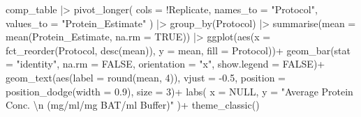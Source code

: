 \documentclass[
  letterpaper,
  DIV=11,
  numbers=noendperiod]{scrreprt}
\newenvironment{Shaded}{\begin{snugshade}}{\end{snugshade}}
\newcommand{\AttributeTok}[1]{\textcolor[rgb]{0.40,0.45,0.13}{#1}}
\newcommand{\ConstantTok}[1]{\textcolor[rgb]{0.56,0.35,0.01}{#1}}
\newcommand{\DecValTok}[1]{\textcolor[rgb]{0.68,0.00,0.00}{#1}}
\newcommand{\FloatTok}[1]{\textcolor[rgb]{0.68,0.00,0.00}{#1}}
\newcommand{\FunctionTok}[1]{\textcolor[rgb]{0.28,0.35,0.67}{#1}}
\newcommand{\NormalTok}[1]{\textcolor[rgb]{0.00,0.23,0.31}{#1}}
\newcommand{\SpecialCharTok}[1]{\textcolor[rgb]{0.37,0.37,0.37}{#1}}
\newcommand{\StringTok}[1]{\textcolor[rgb]{0.13,0.47,0.30}{#1}}
\begin{document}
\begin{Shaded}
\begin{Highlighting}[]
\NormalTok{comp\_table }\SpecialCharTok{|\textgreater{}} 
  \FunctionTok{pivot\_longer}\NormalTok{(}
    \AttributeTok{cols =} \SpecialCharTok{!}\NormalTok{Replicate,}
    \AttributeTok{names\_to =} \StringTok{"Protocol"}\NormalTok{,}
    \AttributeTok{values\_to =} \StringTok{"Protein\_Estimate"}
\NormalTok{  ) }\SpecialCharTok{|\textgreater{}} \FunctionTok{group\_by}\NormalTok{(Protocol) }\SpecialCharTok{|\textgreater{}} \FunctionTok{summarise}\NormalTok{(}\AttributeTok{mean =} \FunctionTok{mean}\NormalTok{(Protein\_Estimate, }\AttributeTok{na.rm =} \ConstantTok{TRUE}\NormalTok{)) }\SpecialCharTok{|\textgreater{}} 
  \FunctionTok{ggplot}\NormalTok{(}\FunctionTok{aes}\NormalTok{(}\AttributeTok{x =} \FunctionTok{fct\_reorder}\NormalTok{(Protocol, }\FunctionTok{desc}\NormalTok{(mean)), }
             \AttributeTok{y =}\NormalTok{ mean, }\AttributeTok{fill =}\NormalTok{ Protocol))}\SpecialCharTok{+}
  \FunctionTok{geom\_bar}\NormalTok{(}\AttributeTok{stat =} \StringTok{"identity"}\NormalTok{, }
           \AttributeTok{na.rm =} \ConstantTok{FALSE}\NormalTok{, }
           \AttributeTok{orientation =} \StringTok{"x"}\NormalTok{,}
           \AttributeTok{show.legend =} \ConstantTok{FALSE}\NormalTok{)}\SpecialCharTok{+}
    \FunctionTok{geom\_text}\NormalTok{(}\FunctionTok{aes}\NormalTok{(}\AttributeTok{label =} \FunctionTok{round}\NormalTok{(mean, }\DecValTok{4}\NormalTok{)),}
    \AttributeTok{vjust =} \SpecialCharTok{{-}}\FloatTok{0.5}\NormalTok{,}
    \AttributeTok{position =} \FunctionTok{position\_dodge}\NormalTok{(}\AttributeTok{width =} \FloatTok{0.9}\NormalTok{),}
    \AttributeTok{size =} \DecValTok{3}\NormalTok{)}\SpecialCharTok{+}
  \FunctionTok{labs}\NormalTok{(}
    \AttributeTok{x =} \ConstantTok{NULL}\NormalTok{,}
    \AttributeTok{y =} \StringTok{"Average Protein Conc. }\SpecialCharTok{\textbackslash{}n}\StringTok{ (mg/ml/mg BAT/ml Buffer)"}
\NormalTok{  )}\SpecialCharTok{+}
  \FunctionTok{theme\_classic}\NormalTok{()}
\end{Highlighting}
\end{Shaded}
\end{document}
